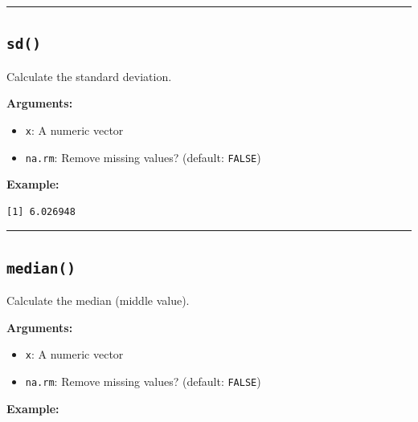 \documentclass[
  letterpaper,
  DIV=11,
  numbers=noendperiod]{scrreprt}
\newenvironment{Shaded}{\begin{snugshade}}{\end{snugshade}}
\newcommand{\FunctionTok}[1]{\textcolor[rgb]{0.28,0.35,0.67}{#1}}
\newcommand{\NormalTok}[1]{\textcolor[rgb]{0.00,0.23,0.31}{#1}}
\newcommand{\SpecialCharTok}[1]{\textcolor[rgb]{0.37,0.37,0.37}{#1}}
\providecommand{\tightlist}{%
  \setlength{\itemsep}{0pt}\setlength{\parskip}{0pt}}
\begin{document}
\begin{center}\rule{0.5\linewidth}{0.5pt}\end{center}

\subsection{\texorpdfstring{\texttt{sd()}}{sd()}}\label{sd}

Calculate the standard deviation.

\textbf{Arguments:}

\begin{itemize}
\tightlist
\item
  \texttt{x}: A numeric vector
\item
  \texttt{na.rm}: Remove missing values? (default: \texttt{FALSE})
\end{itemize}

\textbf{Example:}

\begin{Shaded}
\end{Shaded}

\begin{verbatim}
[1] 6.026948
\end{verbatim}

\begin{center}\rule{0.5\linewidth}{0.5pt}\end{center}

\subsection{\texorpdfstring{\texttt{median()}}{median()}}\label{median}

Calculate the median (middle value).

\textbf{Arguments:}

\begin{itemize}
\tightlist
\item
  \texttt{x}: A numeric vector
\item
  \texttt{na.rm}: Remove missing values? (default: \texttt{FALSE})
\end{itemize}

\textbf{Example:}

\begin{Shaded}
\end{Shaded}
\end{document}
